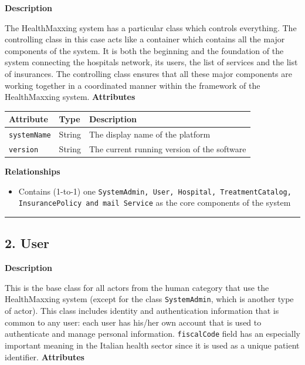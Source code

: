 \documentclass[12pt, a4paper]{article}
\begin{document}
\textbf{Description}

The HealthMaxxing system has a particular class which controls everything. The controlling class in this case acts like a container which contains all the major components of the system. It is both the beginning and the foundation of the system connecting the hospitals network, its users, the list of services and the list of insurances. The controlling class ensures that all these major components are working together in a coordinated manner within the framework of the HealthMaxxing system.
\textbf{Attributes}

\begin{center}
\small
\renewcommand{\arraystretch}{1.35}
\begin{tabularx}{\textwidth}{|>{\raggedright\arraybackslash}p{3.4cm}|>{\raggedright\arraybackslash}p{3.3cm}|Y|}
\hline
{}
\textbf{Attribute} & \textbf{Type} & \textbf{Description} \\ \hline
\texttt{systemName} & String & The display name of the platform \\ \hline
\texttt{version} & String & The current running version of the software \\ \hline
\end{tabularx}
\end{center}

\textbf{Relationships}

\begin{itemize}
    \item Contains (1-to-1) one \texttt{SystemAdmin, User, Hospital, TreatmentCatalog, InsurancePolicy and mail Service} as the core components of the system
\end{itemize}

\par\medskip\hrule\medskip

\subsection{2. User}\label{sec:2-user}

\textbf{Description}

This is the base class for all actors from the human category that use the HealthMaxxing system (except for the class \texttt{SystemAdmin}, which is another type of actor). This class includes identity and authentication information that is common to any user: each user has his/her own account that is used to authenticate and manage personal information. \texttt{fiscalCode} field has an especially important meaning in the Italian health sector since it is used as a unique patient identifier.
\textbf{Attributes}
\end{document}
